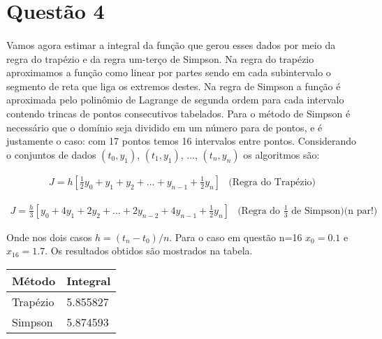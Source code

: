 \section*{Questão 4}

\paragraph{}Vamos agora estimar a integral da função que gerou esses dados por meio da regra 
do trapézio e da regra um-terço de Simpson. Na regra do trapézio aproximamos a função como linear
por partes sendo em cada subintervalo o segmento de reta que liga os extremos destes. Na regra 
de Simpson a função é aproximada pelo polinômio de Lagrange de segunda ordem para cada intervalo contendo
trincas de pontos consecutivos tabelados. Para o método de Simpson é necessário que o domínio seja dividido
em um número para de pontos, e é justamente o caso: com 17 pontos temos 16 intervalos entre pontos.
Considerando o conjuntos de dados $(t_0, y_1)$, $(t_1, y_1)$, $\ldots$, $(t_n, y_n)$ os algoritmos são:

\begin{equation}
\begin{array}{ll}
  J = h[\frac{1}{2} y_0 + y_1 + y_2 + \ldots +y_{n-1} + \frac{1}{2} y_n] &
  \mbox{(Regra do Trapézio)}
\end{array}
\label{eq:trapezio}
\end{equation} 

\begin{equation}
\begin{array}{ll}
  J = \frac{h}{3}[y_0 + 4y_1 + 2y_2 + \ldots + 2y_{n-2} +4y_{n-1} + \frac{1}{2} y_n] &
  \mbox{(Regra do $\frac{1}{3}$ de Simpson)(n par!)}
\end{array}
\label{eq:trapezio}
\end{equation} 

Onde nos dois casos $h = (t_n - t_0)/n$. Para o caso em questão n=16 $x_0 = 0.1$ e $x_{16} = 1.7$. 
Os resultados obtidos são mostrados na tabela. 

\begin{table}[!htp]
  
  \centering
  \begin{tabular}{|l|l|}\hline
      Método & Integral \\ \hline
      Trapézio &  5.855827 \\ \hline
      Simpson & 5.874593 \\ \hline
  \end{tabular}
\end{table}

